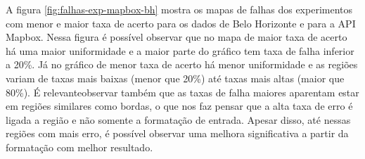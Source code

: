 A figura \ref{fig:falhas-exp-mapbox-bh} mostra os mapas de falhas dos experimentos com menor e maior taxa de acerto para os dados de Belo Horizonte e para a API Mapbox. Nessa figura é possível observar que no mapa de maior taxa de acerto há uma maior uniformidade e a maior parte do gráfico tem taxa de falha inferior a 20\%. Já no gráfico de menor taxa de acerto há menor uniformidade e as regiões variam de taxas mais baixas (menor que 20\%) até taxas mais altas (maior que 80\%). É relevanteobservar também que as taxas de falha maiores aparentam estar em regiões similares como bordas, o que nos faz pensar que a alta taxa de erro é ligada a região e não somente a formatação de entrada. Apesar disso, até nessas regiões com mais erro, é possível observar uma melhora significativa a partir da formatação com melhor resultado. 


